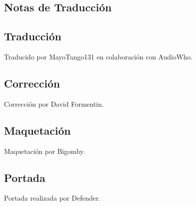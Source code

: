 \begin{center}
 \section*{Notas de Traducción}
\end{center}

\subsection*{Traducción}\label{traducciuxf3n}
Traducido por MayoTango131 en colaboración con AudioWho.

\subsection*{Corrección}\label{correcciuxf3n}
Corrección por David Formentin.

\subsection*{Maquetación}\label{maquetaciuxf3n}
Maquetación por Bigomby.

\subsection*{Portada}\label{portada}
Portada realizada por Defender.
